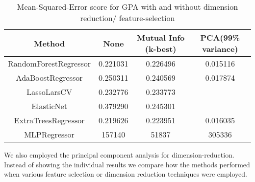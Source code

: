 \begin{table}[H]
\centering
	\begin{tabular}{|c|c|c|c|}
	\hline
	Method & None & Mutual Info (k-best) & PCA(99\% variance)\\
	\hline
	RandomForestRegressor	&	0.221031	&	0.226496	&	0.015116	\\
	AdaBoostRegressor		&	0.250311	&	0.240569	&	0.017874	\\
	LassoLarsCV				&	0.232776	&	0.233773	&		\\
	ElasticNet				&	0.379290	&	0.245301	&		\\
	ExtraTreesRegressor		&	0.219626	&	0.223951	&	0.016035	\\
	MLPRegressor			&	157140	&	51837	&	305336	\\
	\hline
	\end{tabular}
	\caption{Mean-Squared-Error score for GPA with and without dimension reduction/ feature-selection}
\end{table}

We also employed the principal component analysis for dimension-reduction. Instead of showing the individual results we compare how the methods performed when various feature selection or dimension reduction techniques were employed.

